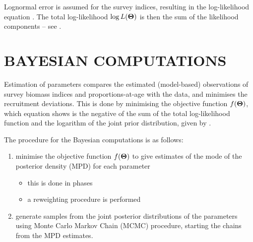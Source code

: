 
Lognormal error is assumed for the survey indices, resulting in the log-likelihood equation . The total log-likelihood $\log L({\bf \Theta})$ is then the sum of the likelihood components -- see .





\section{BAYESIAN COMPUTATIONS}

Estimation of parameters compares the estimated (model-based) observations of survey biomass indices and proportions-at-age with the data, and minimises the recruitment deviations. This is done by minimising the objective function $f({\bf \Theta})$, which equation  shows is the negative of the sum of the total log-likelihood function and the logarithm of the joint prior distribution, given by .

The procedure for the Bayesian computations is as follows:
\begin{enumerate}
\item minimise the objective function $f({\bf \Theta})$ to give estimates of the mode of the posterior density (MPD) for each parameter

\begin{itemize}

\item this is done in phases  %
   
\item a reweighting procedure is performed 

\end{itemize}

\item generate samples from the joint posterior distributions of the parameters using Monte Carlo Markov Chain (MCMC) procedure, starting the chains from the MPD estimates.
\end{enumerate}

